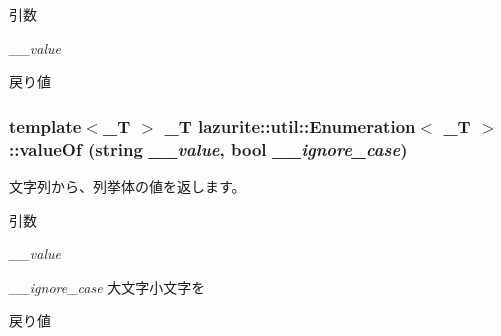 \begin{DoxyParams}{引数}
\item[{\em \_\-\_\-value}]\end{DoxyParams}
\begin{DoxyReturn}{戻り値}

\end{DoxyReturn}
\hypertarget{classlazurite_1_1util_1_1_enumeration_3_01___t_01_4_a493809484770ef37b632b459aef2abad}{
\subsubsection[{valueOf}]{\setlength{\rightskip}{0pt plus 5cm}template$<$\_\-T $>$ \_\-T lazurite::util::Enumeration$<$ \_\-T $>$::valueOf (string {\em \_\-\_\-value}, \/  bool {\em \_\-\_\-ignore\_\-case})}}
\label{classlazurite_1_1util_1_1_enumeration_3_01___t_01_4_a493809484770ef37b632b459aef2abad}


文字列から、列挙体の値を返します。 
\begin{DoxyParams}{引数}
\item[{\em \_\-\_\-value}]\item[{\em \_\-\_\-ignore\_\-case}]大文字小文字を\end{DoxyParams}
\begin{DoxyReturn}{戻り値}

\end{DoxyReturn}


